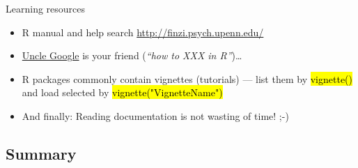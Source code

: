 \documentclass[compress, ucs, xelatex, 11pt, xcolor=svgnames,
	hyperref={
		bookmarks=true,
		unicode=true,
		colorlinks=true,
		pdftitle={Molecular data in R},
		plainpages=false,
		pdfauthor={Vojtech Zeisek},
		pdfsubject={Course about phylogeny and evolution in R},
		pdfcreator={XeLaTeX},
		pdfkeywords={R, evolution, phylogeny, molecular data},
		linkcolor=Tomato,
		anchorcolor=SaddleBrown,
		citecolor=Goldenrod,
		filecolor=DarkMagenta,
		menucolor=Sienna,
		urlcolor=DarkTurquoise,
		pdftex},
	url={hyphens, lowtilde} %
	]{beamer}
\renewcommand{\texttt}[1]{\hl{\ttfamily #1}}
\begin{document}
\begin{frame}[allowframebreaks]{Learning resources}
\begin{itemize}
		\item R manual and help search \url{http://finzi.psych.upenn.edu/}
		\item \href{http://rseek.org/}{Uncle Google} is your friend (\textit{``how to XXX in R''})\ldots
		\item R packages commonly contain vignettes (tutorials) --- list them by \texttt{vignette()} and load selected by \texttt{vignette("VignetteName")}
		\item And finally: \alert{Reading documentation is not wasting of time!} ;-)
	\end{itemize}
\end{frame}

\subsection{Summary}
\end{document}
